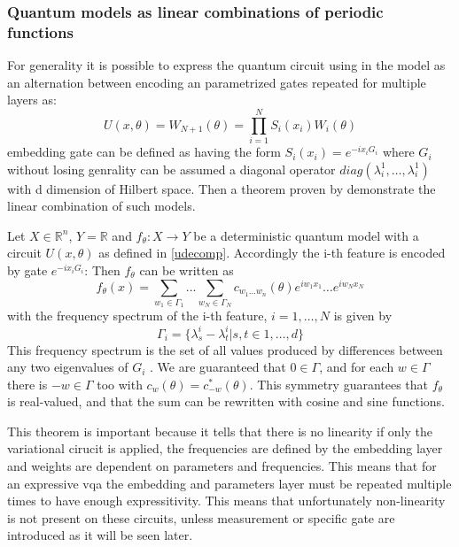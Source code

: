 \subsubsection{Quantum models as linear combinations of periodic functions}
For generality it is possible to express the quantum circuit using in the model as an alternation between encoding an parametrized gates repeated for multiple layers as:
\begin{equation}\label{udecomp}
	U(x,\theta) = W_{N+1}(\theta) = \prod_{i = 1}^{N} S_i(x_i)W_i(\theta)
\end{equation}
embedding gate can be defined as having the form $S_i(x_i) = e^{-i x_i G_i} $ where $G_i$ without losing genrality can be assumed a diagonal operator $diag(\lambda_{i}^{1}, \dots, \lambda_{i}^{1} )$ with d dimension of Hilbert space. Then a theorem proven by \cite{Schuld_theorem} demonstrate the linear combination of such models.
\begin{theorem}
	Let $X \in \mathbb{R}^n$, $Y = \mathbb{R}$ and $f_\theta:X \to Y$ be a deterministic quantum model with a circuit $U(x,\theta)$ as defined in \ref{udecomp}. Accordingly the i-th  feature is encoded by gate $ e^{-i x_i G_i}$: Then $f_\theta$ can be written as 
	\begin{equation*}
		f_\theta(x) = \sum_{w_1 \in \Gamma_1} \dots \sum_{w_N \in \Gamma_N} c_{w_1 \dots w_n}(\theta) e^{iw_1 x_1} \dots e^{iw_N x_N}
	\end{equation*}
	with the frequency spectrum of the i-th feature, $i=1,\dots,N$ is given by 
	\begin{equation*}
		\Gamma_i = \{\lambda_{s}^{i} - \lambda_{t}^{i} | s, t \in {1, \dots,d} \}
	\end{equation*}
	This frequency spectrum is the set of all values produced by differences between
	any two eigenvalues of $G_i$ . We are guaranteed that $0\in\Gamma$, and for each $w \in \Gamma$	there is $-w \in \Gamma$ too with $c_w(\theta) = c_{-w}^{*}(\theta)$. This symmetry guarantees that $f_\theta$ is real-valued, and that the sum can be rewritten with cosine and sine functions.
\end{theorem}
This theorem is important because it tells that there is no linearity if only the variational cirucit is applied, the frequencies are defined by the embedding layer and weights are dependent on parameters and frequencies. This means that for an expressive \acrlong{vqa} the embedding and parameters layer must be repeated multiple times to have enough expressitivity.
This means that unfortunately non-linearity is not present on these circuits, unless measurement or specific gate are introduced as it will be seen later.
